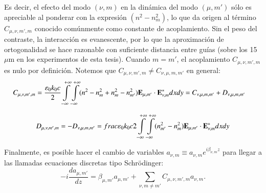 Es decir, el efecto del modo $(\nu, m)$ en la dinámica del modo $(\mu, m')$ sólo es apreciable al ponderar con la expresión $(n^2 - n^2_{m})$, lo que da origen al término $C_{\mu, \nu, m', m}$ conocido comúnmente como constante de acoplamiento. Sin el peso del contraste, la interacción es evanescente, por lo que la aproximación de ortogonalidad se hace razonable con suficiente distancia entre guías (sobre los 15 $\mu$m en los experimentos de esta tesis). Cuando $m=m'$, el acoplamiento $C_{\mu, \nu, m', m}$ es nulo por definición. Notemos que $C_{\mu, \nu, m', m} \neq C_{\nu, \mu, m, m'}$ en general:
\begin{align*}
	C_{\mu, \nu, m', m} &= \frac{\epsilon_0 k_0 c}{2}\int\displaylimits_{-\infty}^{+\infty}\int\displaylimits_{-\infty}^{+\infty} (n^2 - n^2_{m} + n^2_{m} - n^2_{m'}) \textbf{E}_{\mu, m'} \cdot \textbf{E}_{\nu, m}^* dxdy = C_{\nu, \mu, m, m'} + D_{\nu, \mu, m, m'}
\end{align*}

\begin{equation*}
 D_{\mu, \nu, m', m} = -D_{\nu, \mu, m, m'} = frac{\epsilon_0 k_0 c}{2}\int\displaylimits_{-\infty}^{+\infty}\int\displaylimits_{-\infty}^{+\infty} (n^2_{m'}- n^2_{m}) \textbf{E}_{\mu, m'} \cdot \textbf{E}_{\nu, m}^*   dxdy
\end{equation*}

Finalmente, es posible hacer el cambio de variables $a_{\nu, m} \equiv a_{\nu, m} e^{i\beta_{\nu, m} z}$ para llegar a las llamadas ecuaciones discretas tipo Schrödinger:
\begin{equation}
	  	 -i\frac{d a_{\mu, m'}}{dz} = \beta_{\mu, m'} a_{\mu, m'} + \sum_{\nu, m\neq m'}C_{\mu, \nu, m', m}   a_{\nu, m}.
	\label{eqn:CMT1}
\end{equation}



